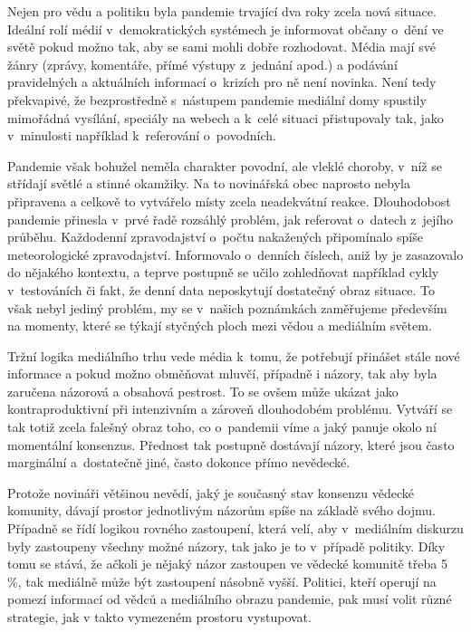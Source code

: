 Nejen pro vědu a politiku byla pandemie trvající dva roky zcela nová situace. Ideální rolí médií v~demokratických systémech je informovat občany o~dění ve světě pokud možno tak, aby se sami mohli dobře rozhodovat. Média mají své žánry (zprávy, komentáře, přímé výstupy z~jednání apod.) a podávání pravidelných a aktuálních informací o~krizích pro ně není novinka. Není tedy překvapivé, že bezprostředně s~nástupem pandemie mediální domy spustily mimořádná vysílání, speciály na we\-bech a k~celé situaci přistupovaly tak, jako v~minulosti například k~referování o~povodních.

Pandemie však bohužel neměla charakter povodní, ale vleklé choroby, v~níž se střídají světlé a stinné okamžiky. Na to novinářská obec naprosto nebyla připravena a celkově to vytvářelo místy zcela neadekvátní reakce. Dlouhodobost pandemie přinesla v~prvé řadě rozsáhlý problém, jak referovat o~datech z~jejího průběhu. Každodenní zpravodajství o~počtu nakažených připomínalo spíše meteorologické zpravodajství. Informovalo o~denních číslech, aniž by je zasazovalo do nějakého kontextu, a teprve postupně se učilo zohledňovat například cykly v~testováních či fakt, že denní data neposkytují dostatečný obraz situace. To však nebyl jediný problém, my se v~našich poznámkách zaměřujeme především na momenty, které se týkají styčných ploch mezi vědou a mediálním světem.

Tržní logika mediálního trhu vede média k~tomu, že potřebují přinášet stále nové informace a pokud možno obměňovat mluvčí, případně i názory, tak aby byla zaručena názorová a obsahová pestrost. To se ovšem může ukázat jako kontraproduktivní při intenzivním a zároveň dlouhodobém problému. Vytváří se tak totiž zcela falešný obraz toho, co o~pandemii víme a jaký panuje okolo ní momentální konsenzus. Přednost tak postupně dostávají názory, které jsou často marginální a~dostatečně jiné, často dokonce přímo nevědecké.

Protože novináři většinou nevědí, jaký je současný stav konsenzu vědecké komunity, dávají prostor jednotlivým názorům spíše na základě svého dojmu. Případně se řídí logikou rovného zastoupení, která velí, aby v~mediálním diskurzu byly zastoupeny všechny možné názory, tak jako je to v~případě politiky. Díky tomu se stává, že ačkoli je nějaký názor zastoupen ve vědecké komunitě třeba 5 \%, tak mediálně může být zastoupení násobně vyšší. Politici, kteří operují na pomezí informací od vědců a mediálního obrazu pandemie, pak musí volit různé strategie, jak v takto vymezeném prostoru vystupovat.

